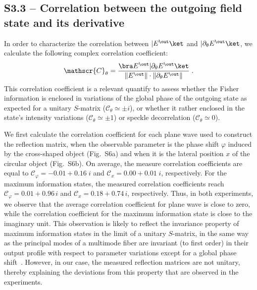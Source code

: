 \documentclass[aps,pra,twocolumn,amsmath,amssymb,superscriptaddress,10pt,nobibnotes]{revtex4-2}
\begin{document}
\subsection*{S3.3 -- Correlation between the outgoing field state and its derivative}

In order to characterize the correlation between $|E^\out\ket$ and $|\partial_\theta E^\out\ket$, we calculate the following complex correlation coefficient:
\begin{equation}
\mathscr{C}_\theta=\frac{\bra E^\out | \partial_\theta E^\out \ket }{\Vert E^\out \Vert \cdot \Vert \partial_\theta E^\out \Vert} \; .
\end{equation}
This correlation coefficient is a relevant quantify to assess whether the Fisher information is enclosed in variations of the global phase of the outgoing state as expected for a unitary $S$-matrix ($\mathscr{C}_\theta\simeq \pm i$), or whether it rather enclosed in the state's intensity variations ($\mathscr{C}_\theta\simeq \pm 1$) or speckle decorrelation ($\mathscr{C}_\theta\simeq 0$).

We first calculate the correlation coefficient for each plane wave used to construct the reflection matrix, when the observable parameter is the phase shift $\varphi$ induced by the cross-shaped object (Fig.~S6a) and when it is the lateral position $x$ of the circular object (Fig.~S6b). On average, the measure correlation coefficients are equal to $\mathscr{C}_\varphi=-0.01+0.16\;i$ and $\mathscr{C}_x=0.00+0.01\;i$, respectively. For the maximum information states, the measured correlation coefficients reach $\mathscr{C}_\varphi=0.01+0.96 \, i$ and $\mathscr{C}_x=0.18+0.74 \, i$, respectively. Thus, in both experiments, we observe that the average correlation coefficient for plane wave is close to zero, while the correlation coefficient for the maximum information state is close to the imaginary unit. This observation is likely to reflect the invariance property of maximum information states in the limit of a unitary $S$-matrix, in the same way as the principal modes of a multimode fiber are invariant (to first order) in their output profile with respect to parameter variations except for a global phase shift~\cite{fan_principal_2005_1,carpenter_observation_2015_1,xiong_spatiotemporal_2016_1}. However, in our case, the measured reflection matrices are not unitary, thereby explaining the deviations from this property that are observed in the experiments.
\end{document}
